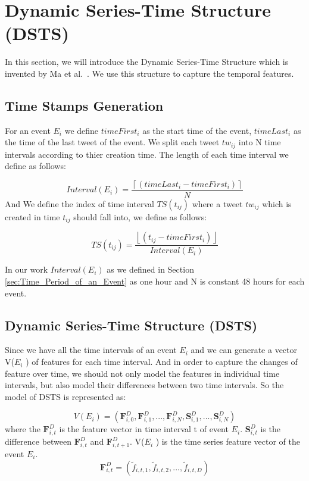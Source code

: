   \section{ Dynamic Series-Time Structure (DSTS)} 
  In this section, we will introduce the Dynamic Series-Time Structure which is invented by Ma et al.~\cite{ma2015detect}. We use this structure to capture the temporal features.  
   \subsection{Time Stamps Generation} 
For an event $E_i$ we define $timeFirst_i$ as the start time of the event, $timeLast_i$ as the time of the last tweet of the event. We split each tweet $tw_{ij}$ into N time intervals according to thier creation time. The length of each time interval we define as follows: 

\begin{equation}
Interval(E_i)=\frac{\left \lceil { (timeLast_i-timeFirst_i) }\right \rceil}{N}
\end{equation}
And We define the index of time interval $TS(t_{ij})$ where a tweet $tw_{ij}$ which is created in time $t_{ij}$ should fall into, we define as follows:

\begin{equation}
TS(t_{ij})=\frac{\left \lfloor { (t_{ij}-timeFirst_i) }\right \rfloor}{Interval(E_i)}
\end{equation}

In our work $Interval(E_i)$ as we defined in Section \ref{sec:Time_Period_of_an_Event} as one hour and N is constant 48 hours for each event. 

   \subsection{Dynamic Series-Time Structure (DSTS)} 
Since we have all the time intervals of an event $E_i$ and we can generate a vector V($E_i$ ) of features for each time interval. And in order to capture the changes of feature over time, we should not only model the features in individual time intervals, but also model their differences between two time intervals. So the model of DSTS is represented as: 

\begin{equation}
 V(E_i)=(\textbf{F}^D_{i,0}, \textbf{F}^D_{i,1},..., \textbf{F}^D_{i,N},\textbf{S}^D_{i,1},..., \textbf{S}^D_{i,N})
\end{equation}
where the $\textbf{F}^D_{i,t}$ is the feature vector in time interval t of event $E_i$. $\textbf{S}^D_{i,t}$ is the difference between $\textbf{F}^D_{i,t}$ and $\textbf{F}^D_{i,t+1}$. V($E_i$ ) is the time series feature vector of the event $E_i$.
\begin{equation}
\textbf{F}^D_{i,t}=(\widetilde{ f}_{i,t,1},\widetilde{ f}_{i,t,2},...,\widetilde{ f}_{i,t,D})
\end{equation}


